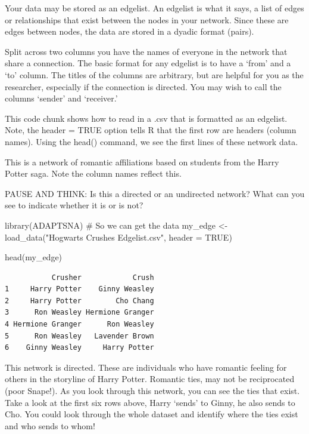 \documentclass[
  letterpaper,
  DIV=11,
  numbers=noendperiod]{scrreprt}
\newenvironment{Shaded}{\begin{snugshade}}{\end{snugshade}}
\newcommand{\AttributeTok}[1]{\textcolor[rgb]{0.40,0.45,0.13}{#1}}
\newcommand{\CommentTok}[1]{\textcolor[rgb]{0.37,0.37,0.37}{#1}}
\newcommand{\ConstantTok}[1]{\textcolor[rgb]{0.56,0.35,0.01}{#1}}
\newcommand{\FunctionTok}[1]{\textcolor[rgb]{0.28,0.35,0.67}{#1}}
\newcommand{\NormalTok}[1]{\textcolor[rgb]{0.00,0.23,0.31}{#1}}
\newcommand{\OtherTok}[1]{\textcolor[rgb]{0.00,0.23,0.31}{#1}}
\newcommand{\StringTok}[1]{\textcolor[rgb]{0.13,0.47,0.30}{#1}}
\begin{document}
Your data may be stored as an edgelist. An edgelist is what it says, a
list of edges or relationships that exist between the nodes in your
network. Since these are edges between nodes, the data are stored in a
dyadic format (pairs).

Split across two columns you have the names of everyone in the network
that share a connection. The basic format for any edgelist is to have a
`from' and a `to' column. The titles of the columns are arbitrary, but
are helpful for you as the researcher, especially if the connection is
directed. You may wish to call the columns `sender' and `receiver.'

This code chunk shows how to read in a .csv that is formatted as an
edgelist. Note, the header = TRUE option tells R that the first row are
headers (column names). Using the head() command, we see the first lines
of these network data.

This is a network of romantic affiliations based on students from the
Harry Potter saga. Note the column names reflect this.

PAUSE AND THINK: Is this a directed or an undirected network? What can
you see to indicate whether it is or is not?

\begin{Shaded}
\begin{Highlighting}[]
\FunctionTok{library}\NormalTok{(ADAPTSNA) }\CommentTok{\# So we can get the data}
\NormalTok{my\_edge }\OtherTok{\textless{}{-}} \FunctionTok{load\_data}\NormalTok{(}\StringTok{"Hogwarts Crushes Edgelist.csv"}\NormalTok{, }\AttributeTok{header =} \ConstantTok{TRUE}\NormalTok{)}

\FunctionTok{head}\NormalTok{(my\_edge)}
\end{Highlighting}
\end{Shaded}

\begin{verbatim}
           Crusher            Crush
1     Harry Potter    Ginny Weasley
2     Harry Potter        Cho Chang
3      Ron Weasley Hermione Granger
4 Hermione Granger      Ron Weasley
5      Ron Weasley   Lavender Brown
6    Ginny Weasley     Harry Potter
\end{verbatim}

This network is directed. These are individuals who have romantic
feeling for others in the storyline of Harry Potter. Romantic ties, may
not be reciprocated (poor Snape!). As you look through this network, you
can see the ties that exist. Take a look at the first six rows above,
Harry `sends' to Ginny, he also sends to Cho. You could look through the
whole dataset and identify where the ties exist and who sends to whom!
\end{document}
